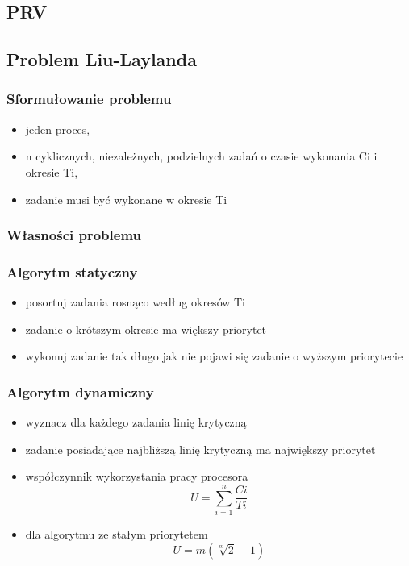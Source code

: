 \documentclass[12pt,a4paper]{article}
\begin{document}
\subsection{PRV}
\subsection{Problem Liu-Laylanda}
\subsubsection{Sformułowanie problemu}
\begin{itemize}
\item jeden proces,
\item n cyklicznych, niezależnych, podzielnych zadań o czasie wykonania Ci i okresie Ti,
\item zadanie musi być wykonane w okresie Ti
\end{itemize}
\subsubsection{Własności problemu}
\subsubsection{Algorytm statyczny}
\begin{itemize}
\item posortuj zadania rosnąco według okresów Ti
\item zadanie o krótszym okresie ma większy priorytet
\item wykonuj zadanie tak długo jak nie pojawi się zadanie o wyższym priorytecie
\end{itemize}
\subsubsection{Algorytm dynamiczny}
\begin{itemize}
\item wyznacz dla każdego zadania linię krytyczną
\item zadanie posiadające najbliższą linię krytyczną ma największy priorytet
\item współczynnik wykorzystania pracy procesora
\begin{equation}
U=\sum\limits_{i=1}^{n}\frac{Ci}{Ti}
\end{equation}
\item dla algorytmu ze stałym priorytetem
\begin{equation}
U=m(\sqrt[m]{2}-1)
\end{equation}
\end{itemize}
\end{document}

